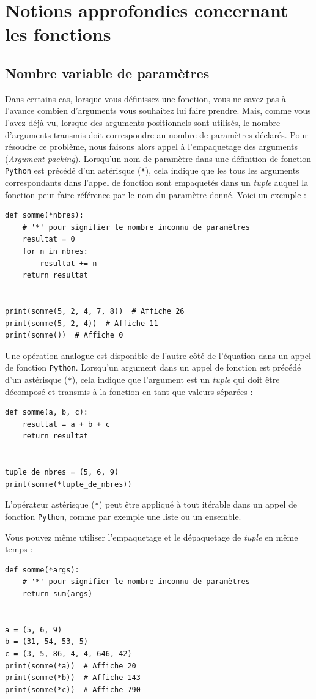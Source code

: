 \documentclass[a4paper,11pt]{book}
\begin{document}
\chapter{Notions approfondies concernant les fonctions}
\section{Nombre variable de paramètres}
Dans certains cas, lorsque vous définissez une fonction, vous ne savez pas à l'avance combien d'arguments vous souhaitez lui faire prendre. Mais, comme vous l'avez déjà vu, lorsque des arguments positionnels sont utilisés, le nombre d'arguments transmis doit correspondre au nombre de paramètres déclarés. Pour résoudre ce problème, nous faisons alors appel à l'empaquetage des arguments (\og \textit{Argument packing}\fg{}). Lorsqu'un nom de paramètre dans une définition de fonction \texttt{Python} est précédé d'un astérisque (\texttt{*}), cela indique que les tous les arguments correspondants dans l'appel de fonction sont empaquetés dans un \textit{tuple} auquel la fonction peut faire référence par le nom du paramètre donné. Voici un exemple :
\begin{lstlisting}[caption=Nombre de paramètres non connu]
def somme(*nbres):  
    # '*' pour signifier le nombre inconnu de paramètres
    resultat = 0
    for n in nbres:
        resultat += n
    return resultat
  
  
print(somme(5, 2, 4, 7, 8))  # Affiche 26
print(somme(5, 2, 4))  # Affiche 11
print(somme())  # Affiche 0
\end{lstlisting}
\medskip

Une opération analogue est disponible de l'autre côté de l'équation dans un appel de fonction \texttt{Python}. Lorsqu'un argument dans un appel de fonction est précédé d'un astérisque (\texttt{*}), cela indique que l'argument est un \textit{tuple} qui doit être décomposé et transmis à la fonction en tant que valeurs séparées :
\begin{lstlisting}[caption=Décomposition de \textit{tuple}]
def somme(a, b, c):
    resultat = a + b + c
    return resultat


tuple_de_nbres = (5, 6, 9)
print(somme(*tuple_de_nbres))
\end{lstlisting}
\medskip

L'opérateur astérisque (\texttt{*}) peut être appliqué à tout itérable dans un appel de fonction \texttt{Python}, comme par exemple une liste ou un ensemble.
\medskip

Vous pouvez même utiliser l'empaquetage et le dépaquetage de \textit{tuple} en même temps :
\begin{lstlisting}[caption=Empaquetage et dépaquetage]
def somme(*args):
    # '*' pour signifier le nombre inconnu de paramètres
    return sum(args)


a = (5, 6, 9)
b = (31, 54, 53, 5)
c = (3, 5, 86, 4, 4, 646, 42)
print(somme(*a))  # Affiche 20
print(somme(*b))  # Affiche 143
print(somme(*c))  # Affiche 790
\end{lstlisting}
\medskip
\end{document}
